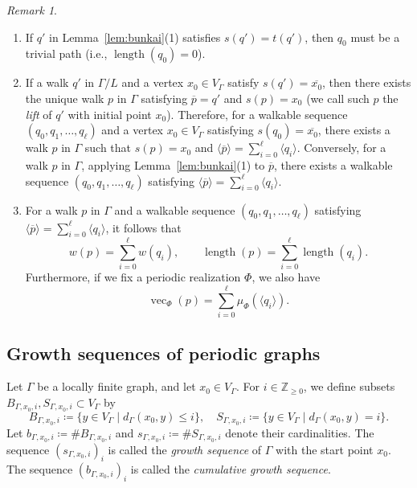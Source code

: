 \documentclass[10pt,a4paper]{amsart}
\theoremstyle{plain}
\theoremstyle{definition}
\theoremstyle{remark}
\newtheorem{rmk}[cdrthm]{Remark}
\begin{document}
\medskip \medskip

\begin{rmk}\label{rmk:bunkai} \hfill
\begin{enumerate}
\item
If $q'$ in Lemma~\ref{lem:bunkai}(1) satisfies $s(q') = t(q')$, then $q_0$ must be a trivial path 
(i.e., $\operatorname{length}(q_0)=0$). 

\item
If a walk $q'$ in $\Gamma /L$ and a vertex $x_0 \in V_{\Gamma}$ satisfy $s(q') = \overline{x_0}$, 
then there exists the unique walk $p$ in $\Gamma$ satisfying $\overline{p} = q'$ and $s(p) = x_0$ 
(we call such $p$ the \textit{lift} of $q'$ with initial point $x_0$). 
Therefore, for a walkable sequence $(q_0, q_1, \ldots, q_{\ell})$ and a vertex $x_0 \in V_{\Gamma}$ satisfying $s(q_0) = \overline{x_0}$, 
there exists a walk $p$ in $\Gamma$ such that 
$s(p) = x_0$ and $\langle \overline{p} \rangle = \sum _{i = 0} ^{\ell} \langle q_i \rangle$. 
Conversely, for a walk $p$ in $\Gamma$, applying Lemma~\ref{lem:bunkai}(1) to $\overline{p}$, 
there exists a walkable sequence $(q_0, q_1, \ldots, q_{\ell})$ satisfying 
$\langle \overline{p} \rangle = \sum _{i = 0} ^{\ell} \langle q_i \rangle$. 

\item
For a walk $p$ in $\Gamma$ and a walkable sequence $(q_0, q_1, \ldots, q_{\ell})$ satisfying 
$\langle \overline{p} \rangle = \sum _{i = 0} ^{\ell} \langle q_i \rangle$,  
it follows that 
\[
w(p) = 
\sum _{i=0}^{\ell} w(q_i), \qquad
\operatorname{length}(p) = 
\sum _{i=0}^{\ell} \operatorname{length}(q_i). 
\]
Furthermore, if we fix a periodic realization $\Phi$, we also have 
\[
\operatorname{vec}_{\Phi}(p) = \sum _{i=0}^{\ell} \mu_{\Phi} ( \langle q_i \rangle). 
\]
\end{enumerate}
\end{rmk}

\setcounter{subsection}{3}
\setcounter{cdrthm}{14}
\subsection{Growth sequences of periodic graphs}\label{subsection:CS}
Let $\Gamma$ be a locally finite graph, and let $x_0 \in V_{\Gamma}$. 
For $i \in \mathbb{Z}_{\ge 0}$, we define subsets $B_{\Gamma, x_0, i}, S_{\Gamma, x_0,i} \subset V _{\Gamma}$ by
\[
B_{\Gamma, x_0,i} \coloneqq  \{ y \in V _{\Gamma} \mid d_{\Gamma}(x_0, y) \le i \}, \quad
S_{\Gamma, x_0,i} \coloneqq  \{ y \in V _{\Gamma} \mid d_{\Gamma}(x_0, y) = i \}. 
\]
Let $b_{\Gamma, x_0,i} \coloneqq  \# B_{\Gamma, x_0,i}$ and $s_{\Gamma, x_0,i} \coloneqq  \# S_{\Gamma, x_0,i}$ denote their cardinalities. 
The sequence $(s_{\Gamma, x_0,i})_i$ is called the \textit{growth sequence} of $\Gamma$ with the start point $x_0$. The sequence $(b_{\Gamma, x_0,i})_i$ is called the \textit{cumulative growth sequence}. 
\end{document}
